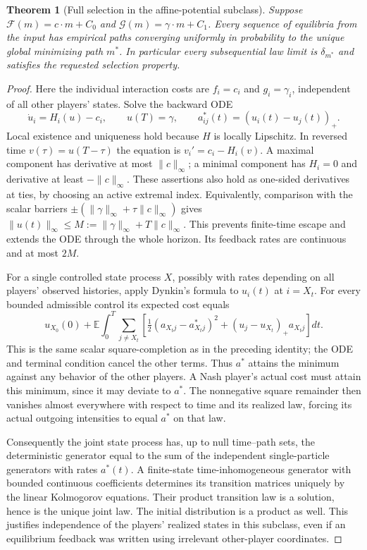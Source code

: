 \documentclass[11pt,a4paper]{article}
\newtheorem{theorem}{Theorem}[section]
\theoremstyle{definition}
\theoremstyle{remark}
\begin{document}
\begin{theorem}[Full selection in the affine-potential subclass]
Suppose $\mathcal F(m)=c\cdot m+C_0$ and $\mathcal G(m)=\gamma\cdot m+C_1$. Every sequence of equilibria from the input has empirical paths converging uniformly in probability to the unique global minimizing path $m^*$. In particular every subsequential law limit is $\delta_{m^*}$ and satisfies the requested selection property.
\end{theorem}
\begin{proof}
Here the individual interaction costs are $f_i=c_i$ and $g_i=\gamma_i$, independent of all other players' states. Solve the backward ODE
\[
 \dot u_i=H_i(u)-c_i,\qquad u(T)=\gamma,
 \qquad a^*_{ij}(t)=(u_i(t)-u_j(t))_+.
\]
Local existence and uniqueness hold because $H$ is locally Lipschitz. In reversed time $v(\tau)=u(T-\tau)$ the equation is $v_i'=c_i-H_i(v)$. A maximal component has derivative at most $\|c\|_\infty$; a minimal component has $H_i=0$ and derivative at least $-\|c\|_\infty$. These assertions also hold as one-sided derivatives at ties, by choosing an active extremal index. Equivalently, comparison with the scalar barriers $\pm(\|\gamma\|_\infty+\tau\|c\|_\infty)$ gives
$\|u(t)\|_\infty\leq M:=\|\gamma\|_\infty+T\|c\|_\infty$.
This prevents finite-time escape and extends the ODE through the whole horizon. Its feedback rates are continuous and at most $2M$.

For a single controlled state process $X$, possibly with rates depending on all players' observed histories, apply Dynkin's formula to $u_i(t)$ at $i=X_t$. For every bounded admissible control its expected cost equals
\[
 u_{X_0}(0)+\mathbb E\int_0^T\sum_{j\ne X_t}
 \left[\tfrac12(a_{X_tj}-a^*_{X_tj})^2+
              (u_j-u_{X_t})_+a_{X_tj}\right]dt.
\]
This is the same scalar square-completion as in the preceding identity; the ODE and terminal condition cancel the other terms. Thus $a^*$ attains the minimum against any behavior of the other players. A Nash player's actual cost must attain this minimum, since it may deviate to $a^*$. The nonnegative square remainder then vanishes almost everywhere with respect to time and its realized law, forcing its actual outgoing intensities to equal $a^*$ on that law.

Consequently the joint state process has, up to null time--path sets, the deterministic generator equal to the sum of the independent single-particle generators with rates $a^*(t)$. A finite-state time-inhomogeneous generator with bounded continuous coefficients determines its transition matrices uniquely by the linear Kolmogorov equations. Their product transition law is a solution, hence is the unique joint law. The initial distribution is a product as well. This justifies independence of the players' realized states in this subclass, even if an equilibrium feedback was written using irrelevant other-player coordinates.


\end{proof}
\end{document}
